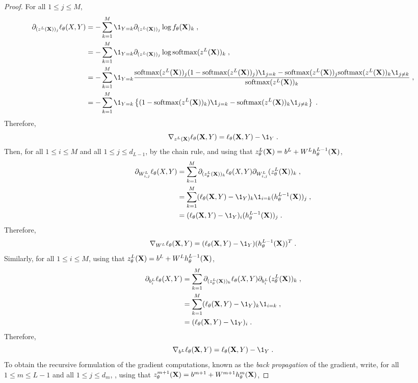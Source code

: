 \begin{proof}
For all $1\leqslant j\leqslant M$,
\begin{align*}
\partial_{(z^L(\bX))_j}\ell_{\theta}(X,Y) &=  -\sum_{k=1}^{M} \1_{Y=k}\partial_{(z^L(\bX))_j}\log f_{\theta}(\bX)_k\eqsp,\\
&=  -\sum_{k=1}^{M} \1_{Y=k}\partial_{(z^L(\bX))_j}\log \mathrm{softmax}(z^L(\bX))_k\eqsp,\\
&=  -\sum_{k=1}^{M} \1_{Y=k}\frac{\mathrm{softmax}(z^L(\bX))_j (1-\mathrm{softmax}(z^L(\bX))_j )\1_{j=k} - \mathrm{softmax}(z^L(\bX))_j \mathrm{softmax}(z^L(\bX))_k\1_{j\neq k}}{\mathrm{softmax}(z^L(\bX))_k}\eqsp,\\
&=  -\sum_{k=1}^{M} \1_{Y=k}\left\{(1-\mathrm{softmax}(z^L(\bX))_k )\1_{j=k} -  \mathrm{softmax}(z^L(\bX))_k\1_{j\neq k}\right\}\eqsp.
\end{align*}
Therefore,
$$
\nabla_{z^L(\bX)} \ell_{\theta}(\bX,Y) = \ell_{\theta}(\bX,Y) - \1_Y\eqsp.
$$
Then, for all $1\leqslant i\leqslant M$ and all $1\leqslant j \leqslant d_{L-1}$, by the chain rule, and using that $z_{\theta}^L(\mathbf{X}) = b^L + W^Lh_{\theta}^{L-1}(\mathbf{X})$,
\begin{align*}
\partial_{W^L_{i,j}}\ell_{\theta}(X,Y) &=  \sum_{k=1}^{M} \partial_{(z_{\theta}^L(\bX))_k}\ell_{\theta}(X,Y)\partial_{W^L_{i,j}}(z_{\theta}^L(\bX))_k\eqsp,\\
&=  \sum_{k=1}^{M} (\ell_{\theta}(\bX,Y) - \1_Y)_k\1_{i=k}(h_{\theta}^{L-1}(\bX))_j\eqsp,\\
&=  (\ell_{\theta}(\bX,Y) - \1_Y)_i(h_{\theta}^{L-1}(\bX))_j\eqsp.
\end{align*}
Therefore,
$$
\nabla_{W^L} \ell_{\theta}(\bX,Y) = (\ell_{\theta}(\bX,Y) - \1_Y)(h_{\theta}^{L-1}(\bX))^T\eqsp.
$$
Similarly, for all $1\leqslant i\leqslant M$,  using that $z_{\theta}^L(\mathbf{X}) = b^L + W^Lh_{\theta}^{L-1}(\mathbf{X})$,
\begin{align*}
\partial_{b^L_{i}}\ell_{\theta}(X,Y) &=  \sum_{k=1}^{M} \partial_{(z_{\theta}^L(\bX))_k}\ell_{\theta}(X,Y)\partial_{b^L_{i}}(z_{\theta}^L(\bX))_k\eqsp,\\
&=  \sum_{k=1}^{M} (\ell_{\theta}(\bX,Y) - \1_Y)_k\1_{i=k}\eqsp,\\
&=  (\ell_{\theta}(\bX,Y) - \1_Y)_i\eqsp.
\end{align*}
Therefore,
$$
\nabla_{b^L} \ell_{\theta}(\bX,Y) = \ell_{\theta}(\bX,Y) - \1_Y\eqsp.
$$
To obtain the recursive formulation of the gradient computations, known as the {\em back propagation} of the gradient, write, for all $1\leqslant m \leqslant L-1$ and all $1\leqslant j \leqslant d_m$, ,  using that $z_{\theta}^{m+1}(\mathbf{X}) = b^{m+1} + W^{m+1}h_{\theta}^{m}(\mathbf{X})$,

\end{proof}
